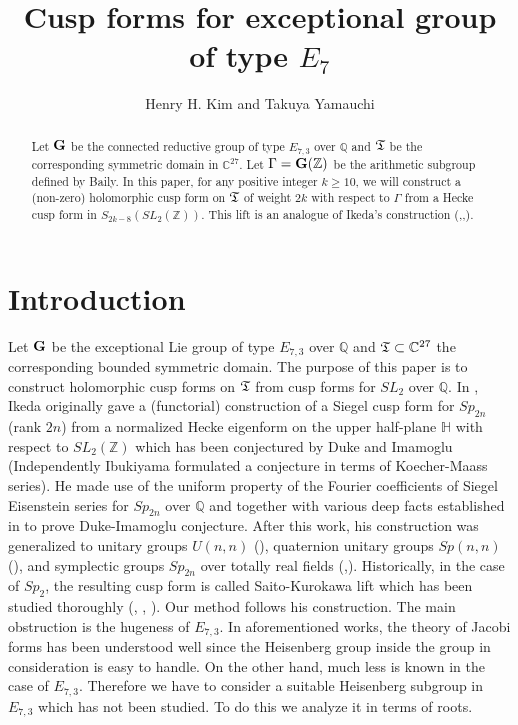 \documentclass[11pt]{amsart}
\title[Cusp forms for exceptional group of type $E_{7}$]
{Cusp forms for exceptional group of type $E_{7}$}
\author{Henry H. Kim and Takuya Yamauchi}
\numberwithin{equation}{section}
\theoremstyle{definition}
\begin{document}
\begin{abstract}
Let $\bold{G}$ be the connected reductive group of type $E_{7,3}$ over ${\mathbb{Q}}$ and $\frak T$ be the corresponding 
symmetric domain in ${\mathbb{C}}^{27}$. Let $\Gamma=\bold{G}({\mathbb{Z}})$ be the arithmetic subgroup defined by Baily. In this paper, for any positive integer $k\ge 10$, we will construct a (non-zero) holomorphic cusp form on $\frak T$ of weight $2k$ with respect to ${\Gamma}$ from 
a Hecke cusp form in $S_{2k-8}(SL_2({\mathbb{Z}}))$. This lift is an analogue of Ikeda's construction 
(\cite{Ik2},\cite{Ik3},\cite{Yamana}).  
\end{abstract}
\maketitle
\tableofcontents

\section{Introduction}
Let $\bold{G}$ be  the exceptional Lie group  of type $E_{7,3}$ over ${\mathbb{Q}}$ and $\frak T\subset {\mathbb{C}}^{27}$ 
the corresponding bounded symmetric domain.  
The purpose of this paper is to construct holomorphic cusp forms on $\frak T$ from cusp forms for $SL_2$ over ${\mathbb{Q}}$. 
In \cite{Ik1}, Ikeda originally gave a (functorial) construction of a Siegel cusp form for $Sp_{2n}$ (rank $2n$) from a normalized Hecke eigenform on the upper half-plane $\mathbb{H}$ with respect to $SL_2({\mathbb{Z}})$ which has been conjectured by Duke and Imamoglu 
(Independently Ibukiyama formulated a conjecture in terms of Koecher-Maass series). He made use of the uniform property of the Fourier 
coefficients of Siegel Eisenstein series for $Sp_{2n}$ over ${\mathbb{Q}}$ and together with various deep facts established in \cite{Ik1} 
to prove Duke-Imamoglu conjecture. 
After this work, his construction was generalized to unitary groups $U(n,n)$ (\cite{Ik2}), 
quaternion unitary groups $Sp(n,n)$ (\cite{Yamana}), and symplectic groups $Sp_{2n}$ over totally real fields (\cite{Ik4},\cite{Ik&H}). 
Historically, in the case of $Sp_2$, the resulting cusp form is called Saito-Kurokawa lift which has been studied thoroughly 
(\cite{kuro}, \cite{ps}, \cite{cog&ps}). Our method follows his construction. The main obstruction is the hugeness of 
$E_{7,3}$. In aforementioned works, the theory of Jacobi forms has been understood well since the Heisenberg group inside the group in consideration is easy to handle. On the other hand, 
much less is known in the case of $E_{7,3}$. Therefore we have to consider a suitable Heisenberg subgroup in $E_{7,3}$ which has not been studied. To do this we analyze it in terms of roots. 
\end{document}
